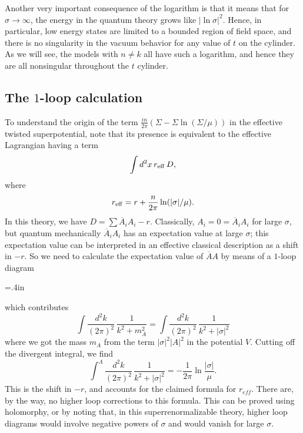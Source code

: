 Another very important consequence of the logarithm is that it means
that for $\sigma\to\infty$, the energy in the quantum theory grows
like $|\ln\sigma|^2$.  Hence, in particular, low energy states are limited
to a bounded region of field space, and there is no singularity in the
vacuum behavior for any value of $t$ on the cylinder.  As we will
see, the models with $n\not= k$ all have such a logarithm, and hence
they are all nonsingular throughout the $ t$ cylinder.

\subsection{The $1$-loop calculation}

To understand the origin of the term
$\frac{in}{2\pi}\left(\Sigma-\Sigma\ln(\Sigma/\mu)\right)$ in the
effective twisted superpotential, note that its presence is equivalent to
the effective Lagrangian having a term
$$\int d^2x\, r_{\rm eff}\, D,$$
where
$$r_{\rm eff}=r+\frac n{2\pi}\ln(|\sigma|/\mu).$$
In this theory, we have $D=\sum\overline{A}_iA_i-r$.  Classically, $A_i=0
=\overline A_iA_i$
for large $\sigma$, but quantum mechanically $\overline A_iA_i$ has
an expectation value at large $\sigma$; this expectation value can
be interpreted in an effective classical description as a shift
in $-r$.  So we need to
calculate the expectation value of $\overline{A}A$ by means of a
$1$-loop diagram

\centerline{\quad}
\centerline{\epsfxsize=.4in}
\centerline{\quad}

\noindent
which contributes
$$\int\frac{d^2k}{(2\pi)^2}\,\frac1{k^2+m_A^2}
=\int\frac{d^2k}{(2\pi)^2}\,\frac1{k^2+|\sigma|^2}$$
where we got the mass $m_A$ from the term $|\sigma|^2|A|^2$ in the
potential $V$.  Cutting off the divergent integral, we find
$$\int^\Lambda\frac{d^2k}{(2\pi)^2}\,\frac1{k^2+|\sigma|^2}
=-\frac{1}{2\pi}\ln\frac{|\sigma|}{\mu}.$$
This is the shift in $-r$, and accounts for the claimed formula for
$r_{eff}$.
There are, by the way, no higher loop corrections to this formula.
This can be proved using holomorphy, or by noting that, in this
superrenormalizable theory, higher loop diagrams would involve
negative powers of $\sigma$ and would vanish for large $\sigma$.


